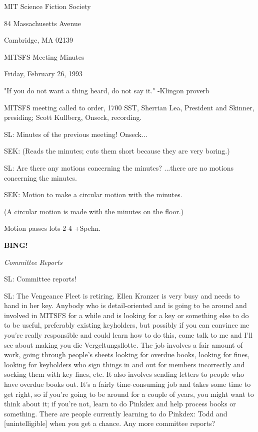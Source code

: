\documentclass[12pt]{article}
\newcommand{\bing}{{\bf BING!} }
\newcommand{\goto}[1]{\bing \vskip 12pt \centerline{{\em{#1}}}}
\begin{document}
\begin{center}

MIT Science Fiction Society 

84 Massachusetts Avenue

Cambridge, MA 02139

\vspace{12pt}

MITSFS Meeting Minutes 

Friday, February 26, 1993

"If you do not want a thing heard, do not say it." -Klingon proverb

\end{center}
 
\vspace{18pt}

\setlength{\parskip}{6pt}

\noindent
MITSFS meeting called to order, 1700 SST,
Sherrian Lea, President and Skinner, presiding; Scott Kullberg, Onseck, recording.

SL: Minutes of the previous meeting! Onseck...

SEK: (Reads the minutes; cuts them short because they are very boring.)

SL: Are there any motions concerning the minutes? ...there are no motions concerning the minutes.

SEK: Motion to make a circular motion with the minutes.

(A circular motion is made with the minutes on the floor.)

Motion passes lots-2-4 +Spehn.

\goto{Committee Reports}

SL: Committee reports!

SL: The Vengeance Fleet is retiring. Ellen Kranzer is very busy and needs to hand in her key. Anybody who is detail-oriented and is going to be around and involved in MITSFS for a while and is looking for a key or something else to do to be useful, preferably existing keyholders, but possibly if you can convince me you're really responsible and could learn how to do this, come talk to me and I'll see about making you die Vergeltungsflotte. The job involves a fair amount of work, going through people's sheets looking for overdue books, looking for fines, looking for keyholders who sign things in and out for members incorrectly and socking them with key fines, etc. It also involves sending letters to people who have overdue books out. It's a fairly time-consuming job and takes some time to get right, so if you're going to be around for a couple of years, you might want to think about it; if you're not, learn to do Pinkdex and help process books or something. There are people currently learning to do Pinkdex: Todd and [unintelligible] when you get a chance. Any more committee reports?
\end{document}
